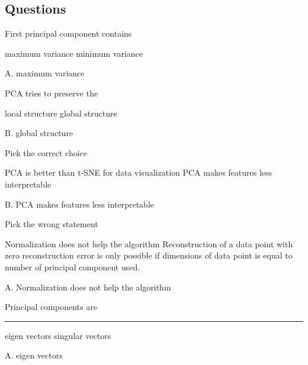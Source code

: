 \documentclass[12pt,letterpaper, onecolumn]{exam}
\begin{document}
\subsection*{Questions}
\begin{questions}
\question[] First principal component contains
\begin{choices}
\choice maximum variance
\choice minimum variance
\end{choices}
\begin{Solution}
A. maximum variance
\end{Solution}

\question[] PCA tries to preserve the
\begin{choices}
\choice local structure
\choice global structure
\end{choices}
\begin{Solution}
B. global structure
\end{Solution}

\question[] Pick the correct choice
\begin{choices}
\choice PCA is better than t-SNE for data visualization
\choice PCA makes features less interpretable 
\end{choices}
\begin{Solution}
B. PCA makes features less interpretable 
\end{Solution}


\question[] Pick the wrong statement
\begin{choices}
\choice Normalization does not help the algorithm
\choice Reconstruction of a data point with zero reconstruction error is only possible if dimensions of data point is equal to number of principal component used. 
\end{choices}
\begin{Solution}
A. Normalization does not help the algorithm
\end{Solution}

\question[] Principal components are \rule{2cm}{0.15mm} 
\begin{choices}
\choice eigen vectors
\choice singular vectors 
\end{choices}
\begin{Solution}
A. eigen vectors
\end{Solution}



\end{questions}
\end{document}
